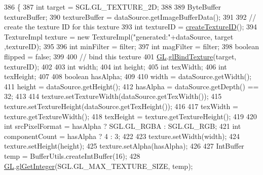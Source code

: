 \begin{DoxyCode}
386     \{ 
387         \textcolor{keywordtype}{int} target = SGL.GL\_TEXTURE\_2D;
388 
389         ByteBuffer textureBuffer;
390         textureBuffer = dataSource.getImageBufferData();
391         
392         \textcolor{comment}{// create the texture ID for this texture }
393         \textcolor{keywordtype}{int} textureID = \mbox{\hyperlink{classorg_1_1newdawn_1_1slick_1_1opengl_1_1_internal_texture_loader_a1bebab39014659d66c3f45bfefb678a1}{createTextureID}}(); 
394         TextureImpl texture = \textcolor{keyword}{new} TextureImpl(\textcolor{stringliteral}{"generated:"}+dataSource, target ,textureID); 
395         
396         \textcolor{keywordtype}{int} minFilter = filter;
397         \textcolor{keywordtype}{int} magFilter = filter;
398         \textcolor{keywordtype}{boolean} flipped = \textcolor{keyword}{false};
399         
400         \textcolor{comment}{// bind this texture }
401         \mbox{\hyperlink{classorg_1_1newdawn_1_1slick_1_1opengl_1_1_internal_texture_loader_a302f0e97810ce583189425dd693ae4c2}{GL}}.\mbox{\hyperlink{interfaceorg_1_1newdawn_1_1slick_1_1opengl_1_1renderer_1_1_s_g_l_a7b546bba69c511f7d96d055ac1ed6a21}{glBindTexture}}(target, textureID); 
402         
403         \textcolor{keywordtype}{int} width;
404         \textcolor{keywordtype}{int} height;
405         \textcolor{keywordtype}{int} texWidth;
406         \textcolor{keywordtype}{int} texHeight;
407         
408         \textcolor{keywordtype}{boolean} hasAlpha;
409         
410         width = dataSource.getWidth();
411         height = dataSource.getHeight();
412         hasAlpha = dataSource.getDepth() == 32;
413         
414         texture.setTextureWidth(dataSource.getTexWidth());
415         texture.setTextureHeight(dataSource.getTexHeight());
416 
417         texWidth = texture.getTextureWidth();
418         texHeight = texture.getTextureHeight();
419         
420         \textcolor{keywordtype}{int} srcPixelFormat = hasAlpha ? SGL.GL\_RGBA : SGL.GL\_RGB;
421         \textcolor{keywordtype}{int} componentCount = hasAlpha ? 4 : 3;
422         
423         texture.setWidth(width);
424         texture.setHeight(height);
425         texture.setAlpha(hasAlpha);
426         
427         IntBuffer temp = BufferUtils.createIntBuffer(16);
428         \mbox{\hyperlink{classorg_1_1newdawn_1_1slick_1_1opengl_1_1_internal_texture_loader_a302f0e97810ce583189425dd693ae4c2}{GL}}.\mbox{\hyperlink{interfaceorg_1_1newdawn_1_1slick_1_1opengl_1_1renderer_1_1_s_g_l_ab04cb68029b55582eb4b17b489cbbb2f}{glGetInteger}}(SGL.GL\_MAX\_TEXTURE\_SIZE, temp);

\end{DoxyCode}
